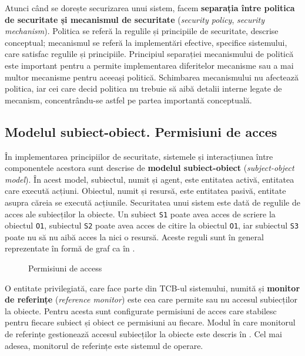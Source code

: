 Atunci când se dorește securizarea unui sistem, facem \textbf{separația între politica de securitate și mecanismul de securitate} (\textit{security policy}, \textit{security mechanism}). Politica se referă la regulile și principiile de securitate, descrise conceptual; mecanismul se referă la implementări efective, specifice sistemului, care satisfac regulile și principiile. Principiul separației mecanismului de politică este important pentru a permite implementarea diferitelor mecanisme sau a mai multor mecanisme pentru aceeași politică. Schimbarea mecanismului nu afectează politica, iar cei care decid politica nu trebuie să aibă detalii interne legate de mecanism, concentrându-se astfel pe partea importantă conceptuală.

\subsection{Modelul subiect-obiect. Permisiuni de acces}
\label{sec:sec:fundamentals:permissions}

În implementarea principiilor de securitate, sistemele și interacțiunea între componentele acestora sunt descrise de \textbf{modelul subiect-obiect} (\textit{subject-object model}). În acest model, subiectul, numit și agent, este entitatea activă, entitatea care execută acțiuni. Obiectul, numit și resursă, este entitatea pasivă, entitate asupra căreia se execută acțiunile. Securitatea unui sistem este dată de regulile de acces ale subiecților la obiecte. Un subiect \texttt{S1} poate avea acces de scriere la obiectul \texttt{O1}, subiectul \texttt{S2} poate avea acces de citire la obiectul \texttt{O1}, iar subiectul \texttt{S3} poate nu să nu aibă acces la nici o resursă. Aceste reguli sunt în general reprezentate în formă de graf ca în .

\begin{figure}[htbp]
  \centering
  \def\svgwidth{\columnwidth}
  
  \caption{Permisiuni de access}
  \label{fig:sec:access-permissions}
\end{figure}

O entitate privilegiată, care face parte din TCB-ul sistemului, numită și \textbf{monitor de referințe} (\textit{reference monitor}) este cea care permite sau nu accesul subiecților la obiecte. Pentru acesta sunt configurate permisiuni de acces care stabilesc pentru fiecare subiect și obiect ce permisiuni au fiecare. Modul în care monitorul de referințe gestionează accesul subiecților la obiecte este descris în . Cel mai adesea, monitorul de referințe este sistemul de operare.

